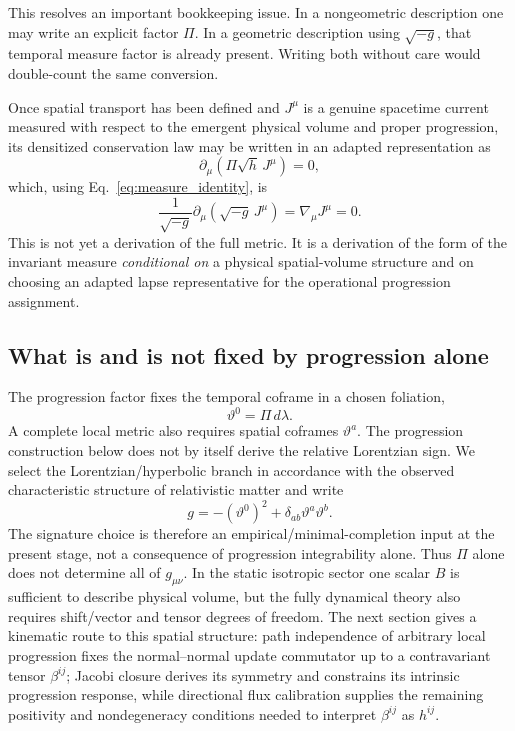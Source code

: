\documentclass[11pt]{article}
\begin{document}
This resolves an important bookkeeping issue. In a nongeometric description one may write an explicit factor $\Pi$. In a geometric description using $\sqrt{-g}$, that temporal measure factor is already present. Writing both without care would double-count the same conversion.

Once spatial transport has been defined and $J^\mu$ is a genuine spacetime current measured with respect to the emergent physical volume and proper progression, its densitized conservation law may be written in an adapted representation as
\begin{equation}
    \partial_\mu\!\left(\Pi\sqrt h\,J^\mu\right)=0,
\end{equation}
which, using Eq.~\eqref{eq:measure_identity}, is
\begin{equation}
    \boxed{
    \frac{1}{\sqrt{-g}}
    \partial_\mu\!\left(\sqrt{-g}\,J^\mu\right)
    =\nabla_\mu J^\mu=0.}
    \label{eq:cov_current}
\end{equation}
This is not yet a derivation of the full metric. It is a derivation of the form of the invariant measure \emph{conditional on} a physical spatial-volume structure and on choosing an adapted lapse representative for the operational progression assignment.

\subsection{What is and is not fixed by progression alone}

The progression factor fixes the temporal coframe in a chosen foliation,
\begin{equation}
    \vartheta^0=\Pi\,d\lambda.
\end{equation}
A complete local metric also requires spatial coframes $\vartheta^a$. The progression construction below does not by itself derive the relative Lorentzian sign. We select the Lorentzian/hyperbolic branch in accordance with the observed characteristic structure of relativistic matter and write
\begin{equation}
    g=-(\vartheta^0)^2+\delta_{ab}\vartheta^a\vartheta^b.
    \label{eq:coframe_metric}
\end{equation}
The signature choice is therefore an empirical/minimal-completion input at the present stage, not a consequence of progression integrability alone.
Thus $\Pi$ alone does not determine all of $g_{\mu\nu}$. In the static isotropic sector one scalar $B$ is sufficient to describe physical volume, but the fully dynamical theory also requires shift/vector and tensor degrees of freedom. The next section gives a kinematic route to this spatial structure: path independence of arbitrary local progression fixes the normal--normal update commutator up to a contravariant tensor $\beta^{ij}$; Jacobi closure derives its symmetry and constrains its intrinsic progression response, while directional flux calibration supplies the remaining positivity and nondegeneracy conditions needed to interpret $\beta^{ij}$ as $h^{ij}$.
\end{document}
